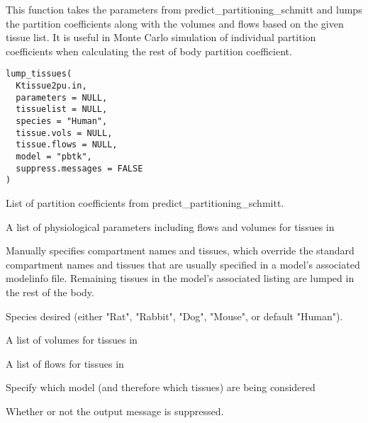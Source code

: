 \documentclass[a4paper]{book}
\begin{document}
%
\begin{Description}\relax
This function takes the parameters from predict\_partitioning\_schmitt and 
lumps the partition coefficients along with the volumes and flows based on 
the given tissue list. It is useful in Monte Carlo simulation of individual
partition coefficients when calculating the rest of body partition
coefficient.
\end{Description}
%
\begin{Usage}
\begin{verbatim}
lump_tissues(
  Ktissue2pu.in,
  parameters = NULL,
  tissuelist = NULL,
  species = "Human",
  tissue.vols = NULL,
  tissue.flows = NULL,
  model = "pbtk",
  suppress.messages = FALSE
)
\end{verbatim}
\end{Usage}
%
\begin{Arguments}
\begin{ldescription}
\item[\code{Ktissue2pu.in}] List of partition coefficients from
predict\_partitioning\_schmitt.

\item[\code{parameters}] A list of physiological parameters including flows and
volumes for tissues in 

\item[\code{tissuelist}] Manually specifies compartment names and tissues, which
override the standard compartment names and tissues that are usually
specified in a model's associated modelinfo file. Remaining tissues in the
model's associated  listing are lumped in the rest of the body.

\item[\code{species}] Species desired (either "Rat", "Rabbit", "Dog", "Mouse", or
default "Human").

\item[\code{tissue.vols}] A list of volumes for tissues in 

\item[\code{tissue.flows}] A list of flows for tissues in 

\item[\code{model}] Specify which model (and therefore which tissues) are being 
considered

\item[\code{suppress.messages}] Whether or not the output message is suppressed.
\end{ldescription}
\end{Arguments}
\end{document}
